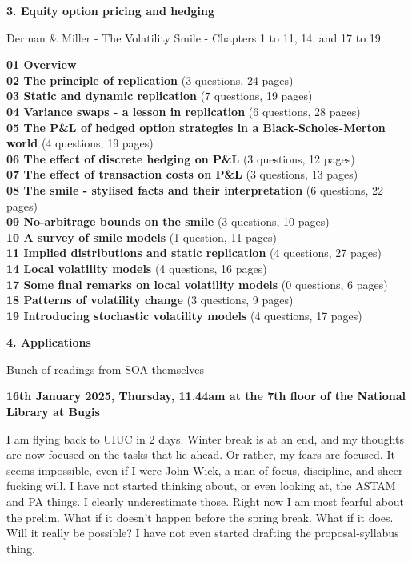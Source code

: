 \documentclass[hidelinks, 12pt]{article}
\theoremstyle{mydefstyle}
\theoremstyle{mythmstyle}
\newcounter{prop}
\begin{document}
\begin{center}
\textbf{3. Equity option pricing and hedging}
\end{center}

Derman \& Miller - The Volatility Smile - Chapters 1 to 11, 14, and 17 to 19

\textbf{01 Overview} \\
\textbf{02 The principle of replication} (3 questions, 24 pages) \\
\textbf{03 Static and dynamic replication} (7 questions, 19 pages) \\
\textbf{04 Variance swaps - a lesson in replication} (6 questions, 28 pages) \\
\textbf{05 The P\&L of hedged option strategies in a Black-Scholes-Merton world} (4 questions, 19 pages) \\
\textbf{06 The effect of discrete hedging on P\&L} (3 questions, 12 pages) \\
\textbf{07 The effect of transaction costs on P\&L} (3 questions, 13 pages) \\
\textbf{08 The smile - stylised facts and their interpretation} (6 questions, 22 pages) \\
\textbf{09 No-arbitrage bounds on the smile} (3 questions, 10 pages) \\
\textbf{10 A survey of smile models} (1 question, 11 pages) \\

\textbf{11 Implied distributions and static replication} (4 questions, 27 pages) \\
\textbf{14 Local volatility models} (4 questions, 16 pages) \\
\textbf{17 Some final remarks on local volatility models} (0 questions, 6 pages) \\
\textbf{18 Patterns of volatility change} (3 questions, 9 pages) \\
\textbf{19 Introducing stochastic volatility models} (4 questions, 17 pages)

\begin{center}
\textbf{4. Applications}
\end{center}

Bunch of readings from SOA themselves

\newpage

\textbf{16th January 2025, Thursday, 11.44am at the 7th floor of the National Library at Bugis}

I am flying back to UIUC in 2 days. Winter break is at an end, and my thoughts are now focused on the tasks that lie ahead. Or rather, my fears are focused. It seems impossible, even if I were John Wick, a man of focus, discipline, and sheer fucking will. I have not started thinking about, or even looking at, the ASTAM and PA things. I clearly underestimate those. Right now I am most fearful about the prelim. What if it doesn't happen before the spring break. What if it does. Will it really be possible? I have not even started drafting the proposal-syllabus thing. 
\end{document}
